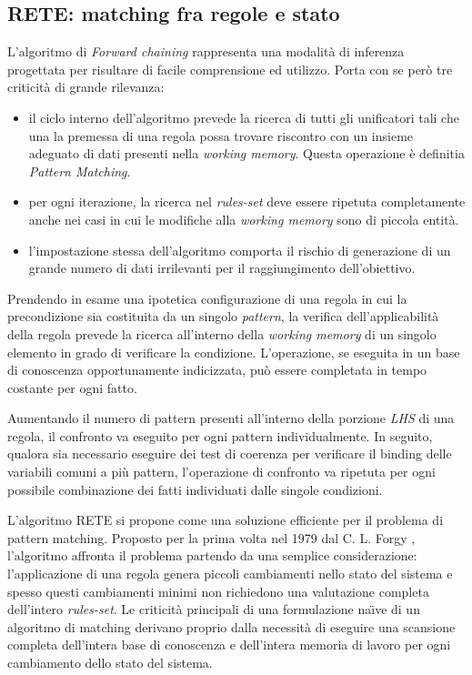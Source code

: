 \subsection{RETE: matching fra regole e stato}
L'algoritmo di \emph{Forward chaining} rappresenta una modalità di inferenza progettata per risultare di facile comprensione ed utilizzo. Porta con se però tre criticità di grande rilevanza: \cite{russellnorvig2009}
\begin{itemize}
	\item il ciclo interno dell'algoritmo prevede la ricerca di tutti gli unificatori tali che una la premessa di una regola possa trovare riscontro con un insieme adeguato di dati presenti nella \emph{working memory}. Questa operazione è definitia \emph{Pattern Matching}.
	\item per ogni iterazione, la ricerca nel \emph{rules-set} deve essere ripetuta completamente anche nei casi in cui le modifiche alla \emph{working memory} sono di piccola entità.
	\item l'impostazione stessa dell'algoritmo comporta il rischio di generazione di un grande numero di dati irrilevanti per il raggiungimento dell'obiettivo.
\end{itemize}

Prendendo in esame una ipotetica configurazione di una regola in cui la precondizione sia costituita da un singolo \emph{pattern}, la verifica dell'applicabilità della regola prevede la ricerca all'interno della \emph{working memory} di un singolo elemento in grado di verificare la condizione. L'operazione, se eseguita in un base di conoscenza opportunamente indicizzata, può essere completata in tempo costante per ogni fatto. \cite{russellnorvig2009}

Aumentando il numero di pattern presenti all'interno della porzione \emph{LHS} di una regola, il confronto va eseguito per ogni pattern individualmente. In seguito, qualora sia necessario eseguire dei test di coerenza per verificare il binding delle variabili comuni a più pattern, l'operazione di confronto va ripetuta per ogni possibile combinazione dei fatti individuati dalle singole condizioni.

L'algoritmo RETE si propone come una soluzione efficiente per il problema di pattern matching. Proposto per la prima volta nel 1979 dal C. L. Forgy \cite{forgy1979} \cite{forgy1982}, l'algoritmo affronta il problema partendo da una semplice considerazione: l'applicazione di una regola genera piccoli cambiamenti nello stato del sistema e spesso questi cambiamenti minimi non richiedono una valutazione completa dell'intero \emph{rules-set}. Le criticità principali di una formulazione na\"{\i}ve di un algoritmo di matching derivano proprio dalla necessità di eseguire una scansione completa dell'intera base di conoscenza e dell'intera memoria di lavoro per ogni cambiamento dello stato del sistema.

